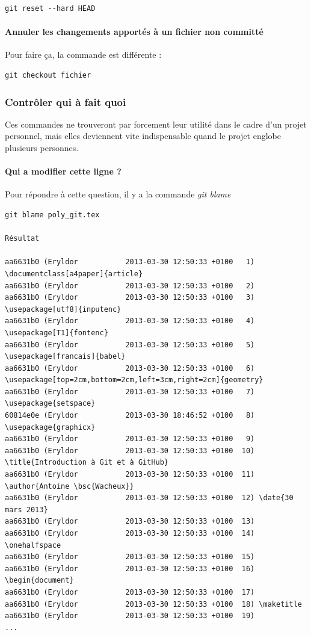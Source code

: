\documentclass[a4paper]{article}
\begin{document}
\begin{verbatim}
git reset --hard HEAD
\end{verbatim}

\paragraph{Annuler les changements apportés à un fichier non committé} Pour faire ça, la commande est différente :

\begin{verbatim}
git checkout fichier
\end{verbatim}

\subsubsection{Contrôler qui à fait quoi}

Ces commandes ne trouveront par forcement leur utilité dans le cadre d'un projet personnel, mais elles deviennent vite indispensable quand le projet englobe plusieurs personnes.

\paragraph{Qui a modifier cette ligne ?} Pour répondre à cette question, il y a la commande \emph{git blame}

\begin{verbatim}
git blame poly_git.tex

Résultat

aa6631b0 (Eryldor           2013-03-30 12:50:33 +0100   1) \documentclass[a4paper]{article}
aa6631b0 (Eryldor           2013-03-30 12:50:33 +0100   2) 
aa6631b0 (Eryldor           2013-03-30 12:50:33 +0100   3) \usepackage[utf8]{inputenc}
aa6631b0 (Eryldor           2013-03-30 12:50:33 +0100   4) \usepackage[T1]{fontenc}
aa6631b0 (Eryldor           2013-03-30 12:50:33 +0100   5) \usepackage[francais]{babel}
aa6631b0 (Eryldor           2013-03-30 12:50:33 +0100   6) \usepackage[top=2cm,bottom=2cm,left=3cm,right=2cm]{geometry}
aa6631b0 (Eryldor           2013-03-30 12:50:33 +0100   7) \usepackage{setspace}
60814e0e (Eryldor           2013-03-30 18:46:52 +0100   8) \usepackage{graphicx}
aa6631b0 (Eryldor           2013-03-30 12:50:33 +0100   9) 
aa6631b0 (Eryldor           2013-03-30 12:50:33 +0100  10) \title{Introduction à Git et à GitHub}
aa6631b0 (Eryldor           2013-03-30 12:50:33 +0100  11) \author{Antoine \bsc{Wacheux}}
aa6631b0 (Eryldor           2013-03-30 12:50:33 +0100  12) \date{30 mars 2013}
aa6631b0 (Eryldor           2013-03-30 12:50:33 +0100  13) 
aa6631b0 (Eryldor           2013-03-30 12:50:33 +0100  14) \onehalfspace
aa6631b0 (Eryldor           2013-03-30 12:50:33 +0100  15) 
aa6631b0 (Eryldor           2013-03-30 12:50:33 +0100  16) \begin{document}
aa6631b0 (Eryldor           2013-03-30 12:50:33 +0100  17) 
aa6631b0 (Eryldor           2013-03-30 12:50:33 +0100  18) \maketitle
aa6631b0 (Eryldor           2013-03-30 12:50:33 +0100  19) 
...
\end{verbatim}
\end{document}
